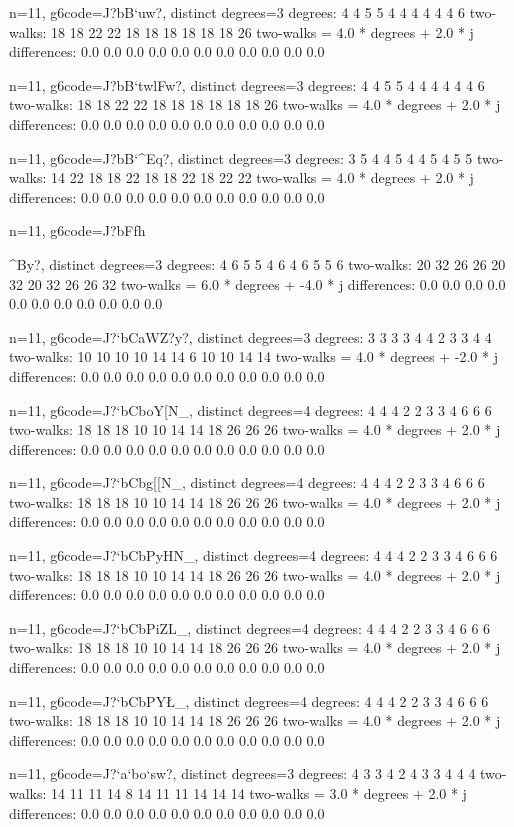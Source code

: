 {{{{{{{{{{{{{{{{{n=11, g6code=J?bB`uw\Fw?, distinct degrees=3
degrees: 4 4 5 5 4 4 4 4 4 4 6 
two-walks: 18 18 22 22 18 18 18 18 18 18 26 
two-walks = 4.0 * degrees + 2.0 * j
differences: 0.0 0.0 0.0 0.0 0.0 0.0 0.0 0.0 0.0 0.0 0.0 

n=11, g6code=J?bB`twlFw?, distinct degrees=3
degrees: 4 4 5 5 4 4 4 4 4 4 6 
two-walks: 18 18 22 22 18 18 18 18 18 18 26 
two-walks = 4.0 * degrees + 2.0 * j
differences: 0.0 0.0 0.0 0.0 0.0 0.0 0.0 0.0 0.0 0.0 0.0 

n=11, g6code=J?bB`\w^Eq?, distinct degrees=3
degrees: 3 5 4 4 5 4 4 5 4 5 5 
two-walks: 14 22 18 18 22 18 18 22 18 22 22 
two-walks = 4.0 * degrees + 2.0 * j
differences: 0.0 0.0 0.0 0.0 0.0 0.0 0.0 0.0 0.0 0.0 0.0 

n=11, g6code=J?bFfh{^By?, distinct degrees=3
degrees: 4 6 5 5 4 6 4 6 5 5 6 
two-walks: 20 32 26 26 20 32 20 32 26 26 32 
two-walks = 6.0 * degrees + -4.0 * j
differences: 0.0 0.0 0.0 0.0 0.0 0.0 0.0 0.0 0.0 0.0 0.0 

n=11, g6code=J?`bCaWZ?y?, distinct degrees=3
degrees: 3 3 3 3 4 4 2 3 3 4 4 
two-walks: 10 10 10 10 14 14 6 10 10 14 14 
two-walks = 4.0 * degrees + -2.0 * j
differences: 0.0 0.0 0.0 0.0 0.0 0.0 0.0 0.0 0.0 0.0 0.0 

n=11, g6code=J?`bCboY[N_, distinct degrees=4
degrees: 4 4 4 2 2 3 3 4 6 6 6 
two-walks: 18 18 18 10 10 14 14 18 26 26 26 
two-walks = 4.0 * degrees + 2.0 * j
differences: 0.0 0.0 0.0 0.0 0.0 0.0 0.0 0.0 0.0 0.0 0.0 

n=11, g6code=J?`bCbg[[N_, distinct degrees=4
degrees: 4 4 4 2 2 3 3 4 6 6 6 
two-walks: 18 18 18 10 10 14 14 18 26 26 26 
two-walks = 4.0 * degrees + 2.0 * j
differences: 0.0 0.0 0.0 0.0 0.0 0.0 0.0 0.0 0.0 0.0 0.0 

n=11, g6code=J?`bCbPyHN_, distinct degrees=4
degrees: 4 4 4 2 2 3 3 4 6 6 6 
two-walks: 18 18 18 10 10 14 14 18 26 26 26 
two-walks = 4.0 * degrees + 2.0 * j
differences: 0.0 0.0 0.0 0.0 0.0 0.0 0.0 0.0 0.0 0.0 0.0 

n=11, g6code=J?`bCbPiZL_, distinct degrees=4
degrees: 4 4 4 2 2 3 3 4 6 6 6 
two-walks: 18 18 18 10 10 14 14 18 26 26 26 
two-walks = 4.0 * degrees + 2.0 * j
differences: 0.0 0.0 0.0 0.0 0.0 0.0 0.0 0.0 0.0 0.0 0.0 

n=11, g6code=J?`bCbPY\L_, distinct degrees=4
degrees: 4 4 4 2 2 3 3 4 6 6 6 
two-walks: 18 18 18 10 10 14 14 18 26 26 26 
two-walks = 4.0 * degrees + 2.0 * j
differences: 0.0 0.0 0.0 0.0 0.0 0.0 0.0 0.0 0.0 0.0 0.0 

n=11, g6code=J?`a`bo`sw?, distinct degrees=3
degrees: 4 3 3 4 2 4 3 3 4 4 4 
two-walks: 14 11 11 14 8 14 11 11 14 14 14 
two-walks = 3.0 * degrees + 2.0 * j
differences: 0.0 0.0 0.0 0.0 0.0 0.0 0.0 0.0 0.0 0.0 0.0 

}}}}}}}}}}}}}}}}}}
